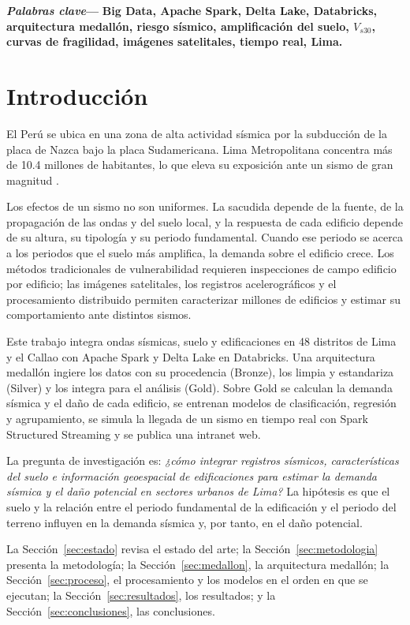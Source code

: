 \documentclass[conference]{IEEEtran}%
\newenvironment{IEEEkeywords}{\par\noindent\textbf{\textit{Palabras clave}---}\bfseries}{\par}}{}
\begin{document}
\begin{IEEEkeywords}
Big Data, Apache Spark, Delta Lake, Databricks, arquitectura medallón, riesgo sísmico, amplificación del suelo, $V_{s30}$, curvas de fragilidad, imágenes satelitales, tiempo real, Lima.
\end{IEEEkeywords}

\section{Introducción}

El Perú se ubica en una zona de alta actividad sísmica por la subducción de la placa de Nazca bajo la placa Sudamericana. Lima Metropolitana concentra más de 10.4 millones de habitantes, lo que eleva su exposición ante un sismo de gran magnitud \cite{tavera2024,inei2025}.

Los efectos de un sismo no son uniformes. La sacudida depende de la fuente, de la propagación de las ondas y del suelo local, y la respuesta de cada edificio depende de su altura, su tipología y su periodo fundamental. Cuando ese periodo se acerca a los periodos que el suelo más amplifica, la demanda sobre el edificio crece. Los métodos tradicionales de vulnerabilidad requieren inspecciones de campo edificio por edificio; las imágenes satelitales, los registros acelerográficos y el procesamiento distribuido permiten caracterizar millones de edificios y estimar su comportamiento ante distintos sismos.

Este trabajo integra ondas sísmicas, suelo y edificaciones en 48 distritos de Lima y el Callao con Apache Spark y Delta Lake en Databricks. Una arquitectura medallón ingiere los datos con su procedencia (Bronze), los limpia y estandariza (Silver) y los integra para el análisis (Gold). Sobre Gold se calculan la demanda sísmica y el daño de cada edificio, se entrenan modelos de clasificación, regresión y agrupamiento, se simula la llegada de un sismo en tiempo real con Spark Structured Streaming y se publica una intranet web.

La pregunta de investigación es: \emph{¿cómo integrar registros sísmicos, características del suelo e información geoespacial de edificaciones para estimar la demanda sísmica y el daño potencial en sectores urbanos de Lima?} La hipótesis es que el suelo y la relación entre el periodo fundamental de la edificación y el periodo del terreno influyen en la demanda sísmica y, por tanto, en el daño potencial.

La Sección~\ref{sec:estado} revisa el estado del arte; la Sección~\ref{sec:metodologia} presenta la metodología; la Sección~\ref{sec:medallon}, la arquitectura medallón; la Sección~\ref{sec:proceso}, el procesamiento y los modelos en el orden en que se ejecutan; la Sección~\ref{sec:resultados}, los resultados; y la Sección~\ref{sec:conclusiones}, las conclusiones.
\end{document}
